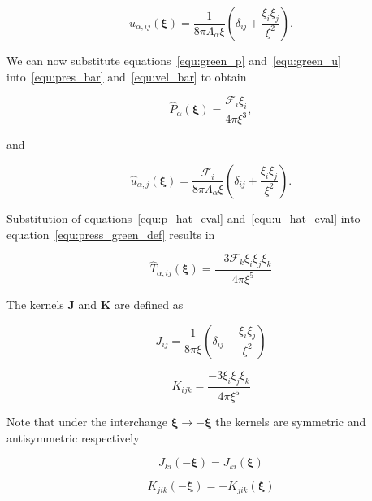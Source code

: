 \documentclass[12pt]{article}
\begin{document}
\begin{equation}
\label{equ:green_u}
\bar{u}_{\alpha,ij} (\boldsymbol\xi) = \frac{1}{8 \pi \Lambda_{\alpha} \xi} \left(\delta_{ij} + \frac{\xi_{i} \xi_{j}}{\xi^{2}} \right).
\end{equation}

We can now substitute equations~\ref{equ:green_p} and~\ref{equ:green_u} into~\ref{equ:pres_bar} and~\ref{equ:vel_bar} to obtain

\begin{equation}
\label{equ:p_hat_eval}
\hat{P}_{\alpha} (\boldsymbol\xi) = \frac{\mathcal{F}_{i} \xi_{i}}{4 \pi \xi^{3}},
\end{equation}

and 

\begin{equation}
\label{equ:u_hat_eval}
\hat{u}_{\alpha,j}(\boldsymbol\xi) = \frac{\mathcal{F}_{i}}{8 \pi \Lambda_{\alpha} \xi} \left(\delta_{ij} + \frac{\xi_{i} \xi_{j}}{\xi^{2}} \right).
\end{equation}


Substitution of equations~\ref{equ:p_hat_eval} and~\ref{equ:u_hat_eval} into equation~\ref{equ:press_green_def} results in

\begin{equation}
\label{equ:green_stress}
\hat{T}_{\alpha, ij} (\boldsymbol\xi) = \frac{-3 \mathcal{F}_{k} \xi_{i} \xi_{j} \xi_{k}}{4 \pi \xi^{5}}
\end{equation}


The kernels $\boldsymbol{J}$ and $\boldsymbol{K}$ are defined as

\begin{equation}
\label{equ:j_kernel}
J_{ij} = \frac{1}{8 \pi \xi} \left(\delta_{ij} + \frac{\xi_{i} \xi_{j}}{\xi^{2}} \right)
\end{equation}

\begin{equation}
\label{equ:k_kernel}
K_{ijk} = \frac{-3 \xi_{i} \xi_{j} \xi_{k}}{4 \pi \xi^{5}}
\end{equation}

Note that under the interchange $\boldsymbol\xi \to -\boldsymbol\xi$ the kernels are symmetric and antisymmetric respectively

\begin{equation}
\label{equ:j_sym}
J_{ki}(-\boldsymbol\xi) = J_{ki}(\boldsymbol\xi)
\end{equation}

\begin{equation}
\label{equ:k_sym}
K_{jik}(-\boldsymbol\xi) = -K_{jik}(\boldsymbol\xi)
\end{equation}
\end{document}
